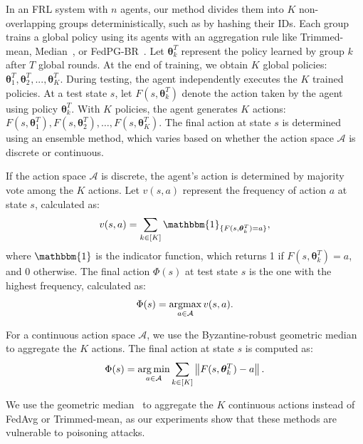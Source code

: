 In an FRL system with $n$ agents, our method divides them into $K$ non-overlapping groups deterministically, such as by hashing their IDs. Each group trains a global policy using its agents with an aggregation rule like Trimmed-mean, Median~\cite{yin2018byzantine}, or FedPG-BR~\cite{fan2021fault}. Let $\bm{\theta}_k^T$ represent the policy learned by group $k$ after $T$ global rounds. At the end of training, we obtain $K$ global policies: $\bm{\theta}_1^T, \bm{\theta}_2^T, ..., \bm{\theta}_K^T$.
%
%
During testing, the agent independently executes the $K$ trained policies. At a test state $s$, let $F(s, \bm{\theta}_k^T)$ denote the action taken by the agent using policy $\bm{\theta}_k^T$. With $K$ policies, the agent generates $K$ actions: \(F(s, \bm{\theta}_1^T), F(s, \bm{\theta}_2^T), \dots, F(s, \bm{\theta}_K^T)\). The final action at state $s$ is determined using an ensemble method, which varies based on whether the action space $\mathcal{A}$ is discrete or continuous.


%
If the action space $\mathcal{A}$ is discrete, the agent's action is determined by majority vote among the $K$ actions. Let $v(s, a)$ represent the frequency of action $a$ at state $s$, calculated as:
\begin{align}
\label{action_freq}
v(s, a) = \sum\limits_{k \in [K]} \mathbbm{1}_{ \{F(s, \bm{\theta}_k^T)=a \}},
\end{align}
where $\mathbbm{1}$ is the indicator function, which returns 1 if \(F(s, \bm{\theta}_k^T) = a\), and 0 otherwise. The final action \(\Phi(s)\) at test state $s$ is the one with the highest frequency, calculated as:
\begin{align}
\label{fina_action_discrete}
\Phi(s) =  \operatorname*{argmax}_{a \in \mathcal{A}} v(s, a).
\end{align}




%
For a continuous action space $\mathcal{A}$, we use the Byzantine-robust geometric median~\cite{ChenPOMACS17} to aggregate the $K$ actions. The final action at state $s$ is computed as:
\begin{align}
\label{fina_action_continuous}
\Phi(s) =  \operatorname*{arg\,min}_{a \in \mathcal{A}} \sum_{k \in [K]} \left\| F(s, \bm{\theta}_k^T) - a \right\|.
\end{align}



We use the geometric median~\cite{ChenPOMACS17} to aggregate the $K$ continuous actions instead of FedAvg or Trimmed-mean, as our experiments show that these methods are vulnerable to poisoning attacks.


